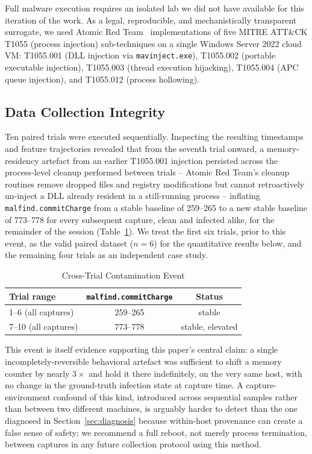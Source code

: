\documentclass[conference]{IEEEtran}
\begin{document}
Full malware execution requires an isolated lab we did not have available for
this iteration of the work. As a legal, reproducible, and mechanistically
transparent surrogate, we used Atomic Red Team~\cite{atomicredteam}
implementations of five MITRE ATT\&CK T1055 (process injection) sub-techniques
on a single Windows Server 2022 cloud VM: T1055.001 (DLL injection via
\texttt{mavinject.exe}), T1055.002 (portable executable injection),
T1055.003 (thread execution hijacking), T1055.004 (APC queue injection), and
T1055.012 (process hollowing).

\subsection{Data Collection Integrity}
Ten paired trials were executed sequentially. Inspecting the resulting
timestamps and feature trajectories revealed that from the seventh trial
onward, a memory-residency artefact from an earlier T1055.001 injection
persisted across the process-level cleanup performed between trials --
Atomic Red Team's cleanup routines remove dropped files and registry
modifications but cannot retroactively un-inject a DLL already resident in a
still-running process -- inflating \texttt{malfind.commitCharge} from a stable
baseline of 259--265 to a new stable baseline of 773--778 for every subsequent
capture, clean and infected alike, for the remainder of the session
(Table~\ref{tab:contamination}). We treat the first six trials, prior to this
event, as the valid paired dataset ($n=6$) for the quantitative results below,
and the remaining four trials as an independent case study.

\begin{table}[htbp]
\caption{Cross-Trial Contamination Event}
\label{tab:contamination}
\centering
\begin{tabular}{lcc}
\toprule
Trial range & \texttt{malfind.commitCharge} & Status \\
\midrule
1--6 (all captures) & 259--265 & stable \\
7--10 (all captures) & 773--778 & stable, elevated \\
\bottomrule
\end{tabular}
\end{table}

This event is itself evidence supporting this paper's central claim: a single
incompletely-reversible behavioral artefact was sufficient to shift a memory
counter by nearly $3\times$ and hold it there indefinitely, on the very same
host, with no change in the ground-truth infection state at capture time. A
capture-environment confound of this kind, introduced across sequential
samples rather than between two different machines, is arguably harder to
detect than the one diagnosed in Section~\ref{sec:diagnosis} because within-host
provenance can create a false sense of safety; we recommend a full reboot,
not merely process termination, between captures in any future collection
protocol using this method.
\end{document}
